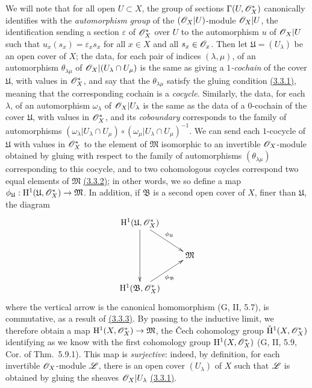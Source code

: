 \begin{env}[5.4.7]
We will note that for all open $U\subset X$, the group of sections
$\Gamma(U,\mathscr{O}_X^*)$ canonically identifies with the {\em automorphism group} of
the $(\mathscr{O}_X|U)$-module $\mathscr{O}_X|U$, the identification sending a section
$\varepsilon$ of $\mathscr{O}_X^*$ over $U$ to the automorphism $u$ of $\mathscr{O}_X|U$ such
that $u_x(s_x)=\varepsilon_x s_x$ for all $x\in X$ and all $s_x\in\mathscr{O}_x$. Then
let $\mathfrak{U}=(U_\lambda)$ be an open cover of $X$; the data, for each pair
of indices $(\lambda,\mu)$, of an automorphism $\theta_{\lambda\mu}$ of
$\mathscr{O}_X|(U_\lambda\cap U_\mu)$ is the same as giving a {\em $1$-cochain} of the
cover $\mathfrak{U}$, with values in $\mathscr{O}_X^*$, and say that the
$\theta_{\lambda\mu}$ satisfy the gluing condition \hyperref[env-0.3.3.1]{(3.3.1)}, meaning
that the corresponding cochain is a {\em cocycle}. Similarly, the data, for
each $\lambda$, of an automorphism $\omega_\lambda$ of $\mathscr{O}_X|U_\lambda$ is the
same as the data of a $0$-cochain of the cover $\mathfrak{U}$, with values in
$\mathscr{O}_X^*$, and its {\em coboundary} corresponds to the family of automorphisms
$(\omega_\lambda|U_\lambda\cap U_\mu)
  \circ(\omega_\mu|U_\lambda\cap U_\mu)^{-1}$. We can send each $1$-cocycle of
$\mathfrak{U}$ with values in $\mathscr{O}_X^*$ to the element of $\mathfrak{M}$
isomorphic to an invertible $\mathscr{O}_X$-module obtained by gluing with respect to
the family of automorphisms $(\theta_{\lambda\mu})$ corresponding to this
cocycle, and to two cohomologous coycles correspond two equal elements of
$\mathfrak{M}$ \hyperref[env-0.3.3.2]{(3.3.2)}; in other words, we so define a map
$\phi_\mathfrak{U}:\mathrm{H}^1(\mathfrak{U},\mathscr{O}_X^*)\to\mathfrak{M}$. In addition, if
$\mathfrak{B}$ is a second open cover of $X$, finer than $\mathfrak{U}$, the
diagram
\[
  \xymatrix{
    \HH^1(\mathfrak{U},\OO_X^*)\ar[rd]^{\vphi_\mathfrak{U}}\ar[dd]\\
    & \mathfrak{M}\\
    \HH^1(\mathfrak{B},\OO_X^*)\ar[ur]_{\vphi_\mathfrak{B}}
  }
\]
where the vertical arrow is the canonical homomorphism (G, II, 5.7), is
commutative, as a result of \hyperref[env-0.3.3.3]{(3.3.3)}. By passing to the inductive
limit, we therefore obtain a map $\mathrm{H}^1(X,\mathscr{O}_X^*)\to\mathfrak{M}$, the \v Cech
cohomology group $\check{\mathrm{H}}^1(X,\mathscr{O}_X^*)$ identifying as we know with the
first cohomology group $\mathrm{H}^1(X,\mathscr{O}_X^*)$ (G, II, 5.9, Cor. of Thm.~5.9.1). This
map is {\em surjective}: indeed, by definition, for each invertible
$\mathscr{O}_X$-module $\mathscr{L}$, there is an open cover $(U_\lambda)$ of $X$ such that
$\mathscr{L}$ is obtained by gluing the sheaves $\mathscr{O}_X|U_\lambda$ \hyperref[env-0.3.3.1]{(3.3.1)}.

\end{env}
